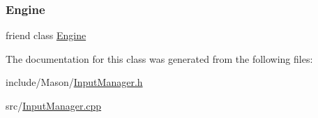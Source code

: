 \subsubsection{\texorpdfstring{Engine}{Engine}}
{\footnotesize\ttfamily friend class \hyperlink{class_mason_1_1_engine}{Engine}\hspace{0.3cm}{\ttfamily [friend]}}



The documentation for this class was generated from the following files\+:\begin{DoxyCompactItemize}
\item 
include/\+Mason/\hyperlink{_input_manager_8h}{Input\+Manager.\+h}\item 
src/\hyperlink{_input_manager_8cpp}{Input\+Manager.\+cpp}\end{DoxyCompactItemize}
